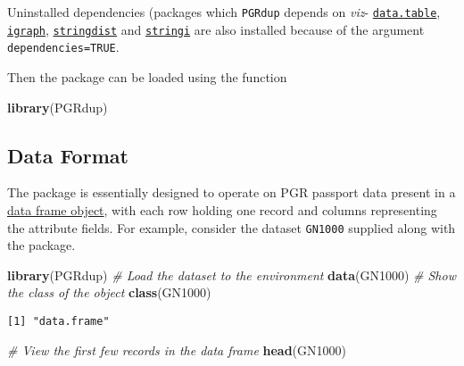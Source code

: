 \documentclass[
]{article}
\newenvironment{Shaded}{\begin{snugshade}}{\end{snugshade}}
\newcommand{\CommentTok}[1]{\textcolor[rgb]{0.56,0.35,0.01}{\textit{#1}}}
\newcommand{\KeywordTok}[1]{\textcolor[rgb]{0.13,0.29,0.53}{\textbf{#1}}}
\newcommand{\NormalTok}[1]{#1}
\begin{document}
Uninstalled dependencies (packages which \texttt{PGRdup} depends on
\emph{viz}-
\href{https://CRAN.R-project.org/package=data.table}{\texttt{data.table}},
\href{https://CRAN.R-project.org/package=igraph}{\texttt{igraph}},
\href{https://CRAN.R-project.org/package=stringdist}{\texttt{stringdist}}
and \href{https://CRAN.R-project.org/package=stringi}{\texttt{stringi}}
are also installed because of the argument \texttt{dependencies=TRUE}.

Then the package can be loaded using the function

\begin{Shaded}
\begin{Highlighting}[]
\KeywordTok{library}\NormalTok{(PGRdup)}
\end{Highlighting}
\end{Shaded}

\hypertarget{data-format}{%
\subsection{Data Format}\label{data-format}}

The package is essentially designed to operate on PGR passport data
present in a \href{http://google.com/\#q=\%5BR\%5D+data.frame}{data
frame object}, with each row holding one record and columns representing
the attribute fields. For example, consider the dataset \texttt{GN1000}
supplied along with the package.

\begin{Shaded}
\begin{Highlighting}[]
\KeywordTok{library}\NormalTok{(PGRdup)}
\CommentTok{# Load the dataset to the environment}
\KeywordTok{data}\NormalTok{(GN1000)}
\CommentTok{# Show the class of the object}
\KeywordTok{class}\NormalTok{(GN1000)}
\end{Highlighting}
\end{Shaded}

\begin{verbatim}
[1] "data.frame"
\end{verbatim}

\begin{Shaded}
\begin{Highlighting}[]
\CommentTok{# View the first few records in the data frame}
\KeywordTok{head}\NormalTok{(GN1000)}
\end{Highlighting}
\end{Shaded}
\end{document}
